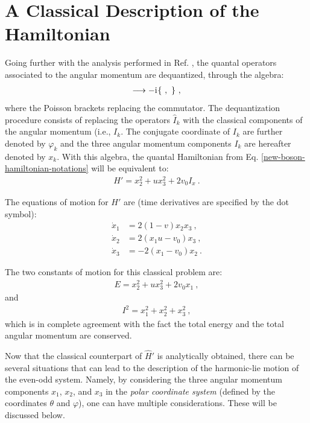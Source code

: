 \section{A Classical Description of the Hamiltonian}
\label{classical-description-new-boson-section}

Going further with the analysis performed in Ref. \cite{raduta2020new}, the quantal operators associated to the angular momentum are dequantized, through the algebra:
\begin{align}
    [\ ,\ ] \longrightarrow -\iu\{\ ,\ \}\ ,
\end{align}
where the Poisson brackets replacing the commutator. The dequantization procedure consists of replacing the operators $\hat{I}_k$ with the classical components of the angular momentum (i.e., $I_k$. The conjugate coordinate of $I_k$ are further denoted by $\varphi_k$ and the three angular momentum components $I_k$ are hereafter denoted by $x_k$. With this algebra, the quantal Hamiltonian from Eq. \ref{new-boson-hamiltonian-notations} will be equivalent to:
\begin{align}
    H'=x_2^2+ux_3^2+2v_0I_x\ .
    \label{new-boson-h-prime-classical}
\end{align}

The equations of motion for $H'$ are (time derivatives are specified by the dot symbol):
\begin{align}
    \dot{x}_1&=2(1-v)x_2x_3\ ,\nonumber\\
    \dot{x}_2&=2(x_1u-v_0)x_3\ ,\nonumber\\
    \dot{x}_3&=-2(x_1-v_0)x_2\ .
\end{align}

The two constants of motion for this classical problem are:
\begin{align}
    E=x_2^2+ux_3^2+2v_0x_1\ ,
\end{align}
and 
\begin{align}
    I^2=x_1^2+x_2^2+x_3^2\ ,
\end{align}
which is in complete agreement with the fact the total energy and the total angular momentum are conserved.

Now that the classical counterpart of $\hat{H}'$ is analytically obtained, there can be several situations that can lead to the description of the harmonic-lie motion of the even-odd system. Namely, by considering the three angular momentum components $x_1$, $x_2$, and $x_3$ in the \emph{polar coordinate system} (defined by the coordinates $\theta$ and $\varphi$), one can have multiple considerations. These will be discussed below.


